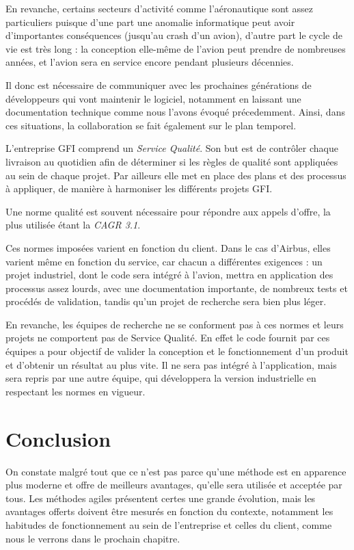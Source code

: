 En revanche, certains secteurs d'activité comme l'aéronautique sont assez particuliers puisque d'une part une anomalie informatique peut avoir d'importantes conséquences (jusqu'au crash d'un avion), d'autre part le cycle de vie est très long : la conception elle-même de l'avion peut prendre de nombreuses années, et l'avion sera en service encore pendant plusieurs décennies.

Il donc est nécessaire de communiquer avec les prochaines générations de développeurs qui vont maintenir le logiciel, notamment en laissant une documentation technique comme nous l'avons évoqué précedemment. Ainsi, dans ces situations, la collaboration se fait également sur le plan temporel.

\begin{app}

L'entreprise GFI comprend un \textit{Service Qualité}. Son but est de contrôler chaque livraison au quotidien afin de déterminer si les règles de qualité sont appliquées au sein de chaque projet. Par ailleurs elle met en place des plans et des processus à appliquer, de manière à harmoniser les différents projets GFI.

Une norme qualité est souvent nécessaire pour répondre aux appels d'offre, la plus utilisée étant la \textit{CAGR 3.1}.

Ces normes imposées varient en fonction du client. Dans le cas d'Airbus, elles varient même en fonction du service, car chacun a différentes exigences : un projet industriel, dont le code sera intégré à l'avion, mettra en application des processus assez lourds, avec une documentation importante, de nombreux tests et procédés de validation, tandis qu'un projet de recherche sera bien plus léger.

En revanche, les équipes de recherche ne se conforment pas à ces normes et leurs projets ne comportent pas de Service Qualité. En effet le code fournit par ces équipes a pour objectif de valider la conception et le fonctionnement d'un produit et d'obtenir un résultat au plus vite. Il ne sera pas intégré à l'application, mais sera repris par une autre équipe, qui développera la version industrielle en respectant les normes en vigueur.
\end{app}

\section{Conclusion}

On constate malgré tout que ce n'est pas parce qu'une méthode est en apparence plus moderne et offre de meilleurs avantages, qu'elle sera utilisée et acceptée par tous. Les méthodes agiles présentent certes une grande évolution, mais les avantages offerts doivent être mesurés en fonction du contexte, notamment les habitudes de fonctionnement au sein de l'entreprise et celles du client, comme nous le verrons dans le prochain chapitre.

